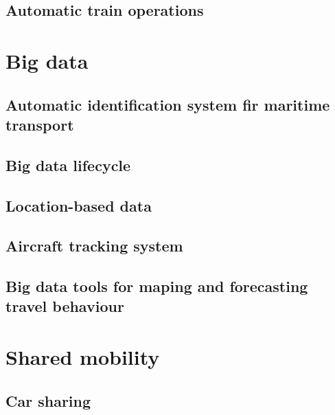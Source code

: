 \documentclass[
]{book}
\begin{document}
\hypertarget{automatic-train-operations}{%
\section{Automatic train operations}\label{automatic-train-operations}}

\hypertarget{big}{%
\chapter{Big data}\label{big}}

\hypertarget{automatic-identification-system-fir-maritime-transport}{%
\section{Automatic identification system fir maritime transport}\label{automatic-identification-system-fir-maritime-transport}}

\hypertarget{big-data-lifecycle}{%
\section{Big data lifecycle}\label{big-data-lifecycle}}

\hypertarget{location-based-data}{%
\section{Location-based data}\label{location-based-data}}

\hypertarget{aircraft-tracking-system}{%
\section{Aircraft tracking system}\label{aircraft-tracking-system}}

\hypertarget{big-data-tools-for-maping-and-forecasting-travel-behaviour}{%
\section{Big data tools for maping and forecasting travel behaviour}\label{big-data-tools-for-maping-and-forecasting-travel-behaviour}}

\hypertarget{shared}{%
\chapter{Shared mobility}\label{shared}}

\hypertarget{car-sharing}{%
\section{Car sharing}\label{car-sharing}}
\end{document}
